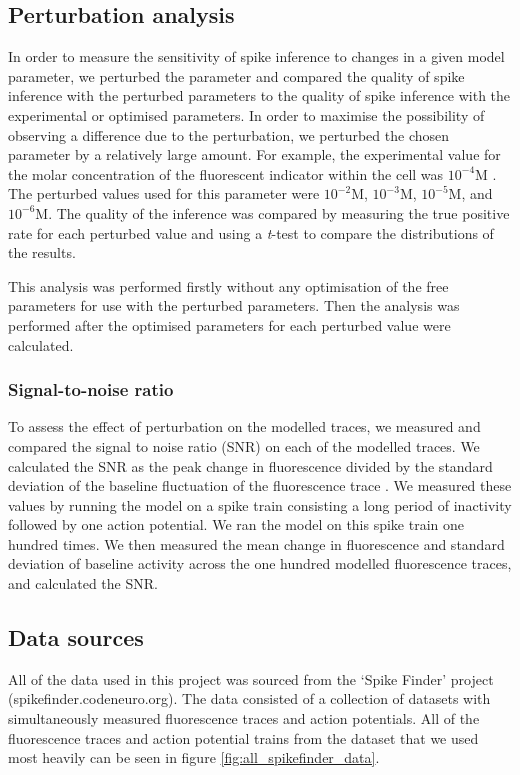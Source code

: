 \documentclass[a4paper,12pt]{article}
\theoremstyle{definition}
\begin{document}
\subsection{Perturbation analysis}
In order to measure the sensitivity of spike inference to changes in a given model parameter, we perturbed the parameter and compared the quality of spike inference with the perturbed parameters to the quality of spike inference with the experimental or optimised parameters. In order to maximise the possibility of observing a difference due to the perturbation, we perturbed the chosen parameter by a relatively large amount. For example, the experimental value for the molar concentration of the fluorescent indicator within the cell was $10^{-4}$M \cite{maravall}. The perturbed values used for this parameter were $10^{-2}$M, $10^{-3}$M, $10^{-5}$M, and $10^{-6}$M. The quality of the inference was compared by measuring the true positive rate for each perturbed value and using a \textit{t}-test to compare the distributions of the results.

This analysis was performed firstly without any optimisation of the free parameters for use with the perturbed parameters. Then the analysis was performed after the optimised parameters for each perturbed value were calculated.

\subsubsection{Signal-to-noise ratio}
To assess the effect of perturbation on the modelled traces, we measured and compared the signal to noise ratio (SNR) on each of the modelled traces. We calculated the SNR as the peak change in fluorescence divided by the standard deviation of the baseline fluctuation of the fluorescence trace \cite{tada}. We measured these values by running the model on a spike train consisting a long period of inactivity followed by one action potential. We ran the model on this spike train one hundred times. We then measured the mean change in fluorescence and standard deviation of baseline activity across the one hundred modelled fluorescence traces, and calculated the SNR.

\subsection{Data sources}
All of the data used in this project was sourced from the `Spike Finder' project (spikefinder.codeneuro.org). The data consisted of a collection of datasets with simultaneously measured fluorescence traces and action potentials. All of the fluorescence traces and action potential trains from the dataset that we used most heavily can be seen in figure \ref{fig:all_spikefinder_data}.
\end{document}
